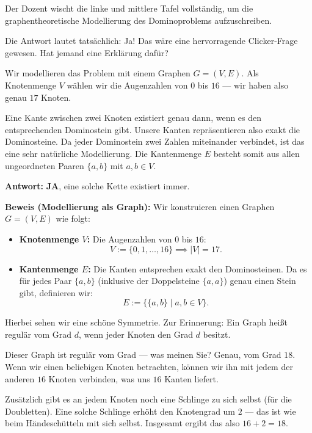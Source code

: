 \begin{meta-note}[Tafelreinigung]
Der Dozent wischt die linke und mittlere Tafel vollständig, um die graphentheoretische Modellierung des Dominoproblems aufzuschreiben.
\end{meta-note}

\begin{spoken-clean}[00:26:25 - 00:28:18]
Die Antwort lautet tatsächlich: Ja! Das wäre eine hervorragende Clicker-Frage gewesen. Hat jemand eine Erklärung dafür?

Wir modellieren das Problem mit einem Graphen $G = (V, E)$. Als Knotenmenge $V$ wählen wir die Augenzahlen von $0$ bis $16$ --- wir haben also genau $17$ Knoten.

Eine Kante zwischen zwei Knoten existiert genau dann, wenn es den entsprechenden Dominostein gibt. Unsere Kanten repräsentieren also exakt die Dominosteine. Da jeder Dominostein zwei Zahlen miteinander verbindet, ist das eine sehr natürliche Modellierung. Die Kantenmenge $E$ besteht somit aus allen ungeordneten Paaren $\{a, b\}$ mit $a, b \in V$.
\end{spoken-clean}

\begin{math-stroke}
\textbf{Antwort:} \textbf{JA}, eine solche Kette existiert immer.

\textbf{Beweis (Modellierung als Graph):}
Wir konstruieren einen Graphen $G = (V, E)$ wie folgt:
\begin{itemize}
    \item \textbf{Knotenmenge $V$:} Die Augenzahlen von $0$ bis $16$:
    \[
    V := \{0, 1, \dots, 16\} \implies |V| = 17.
    \]
    \item \textbf{Kantenmenge $E$:} Die Kanten entsprechen exakt den Dominosteinen. Da es für jedes Paar $\{a, b\}$ (inklusive der Doppelsteine $\{a, a\}$) genau einen Stein gibt, definieren wir:
    \[
    E := \bigl\{ \{a, b\} \;\big|\; a, b \in V \bigr\}.
    \]
\end{itemize}
\end{math-stroke}

\begin{spoken-clean}[00:28:18 - 00:29:55]
Hierbei sehen wir eine schöne Symmetrie. Zur Erinnerung: Ein Graph heißt regulär vom Grad $d$, wenn jeder Knoten den Grad $d$ besitzt.

Dieser Graph ist regulär vom Grad --- was meinen Sie? Genau, vom Grad $18$. Wenn wir einen beliebigen Knoten betrachten, können wir ihn mit jedem der anderen $16$ Knoten verbinden, was uns $16$ Kanten liefert.

Zusätzlich gibt es an jedem Knoten noch eine Schlinge zu sich selbst (für die Doubletten). Eine solche Schlinge erhöht den Knotengrad um $2$ --- das ist wie beim Händeschütteln mit sich selbst. Insgesamt ergibt das also $16 + 2 = 18$.
\end{spoken-clean}

